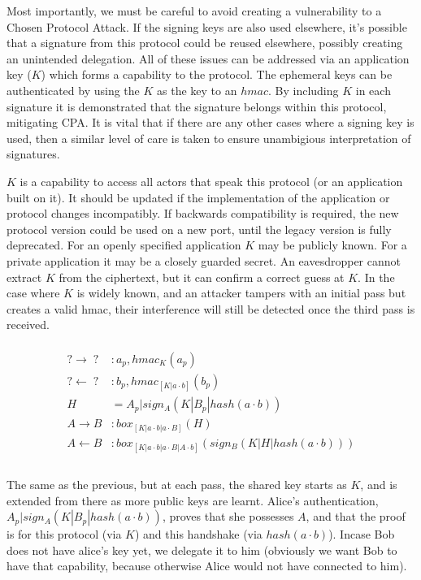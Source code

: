 \documentclass[12pt]{article}
\begin{document}
Most importantly, we must be careful to avoid creating a vulnerability
to a Chosen Protocol Attack\cite{cpa}. If the signing keys are also used
elsewhere, it's possible that a signature from this protocol could be
reused elsewhere, possibly creating an unintended delegation.
All of these issues can be addressed via an application key ($K$)
which forms a capability to the protocol. The ephemeral keys can be
authenticated by using the $K$ as the key to an $hmac$. By including
$K$ in each signature it is demonstrated that the signature belongs
within this protocol, mitigating CPA. It is vital that if there are any
other cases where a signing key is used, then a similar level of care is
taken to ensure unambigious interpretation of signatures.

$K$ is a capability to access all actors that speak this protocol
(or an application built on it). It should be updated if the
implementation of the application or protocol changes incompatibly.
If backwards compatibility is required, the new protocol version could
be used on a new port, until the legacy version is fully deprecated.
For an openly specified application $K$ may be publicly known.
For a private application it may be a closely guarded secret.
An eavesdropper cannot extract $K$ from the ciphertext, but it can
confirm a correct guess at $K$. In the case where $K$ is widely known,
and an attacker tampers with an initial pass but creates a valid hmac,
their interference will still be detected once the third pass is received.

$$
\begin{align*}
\\
    ? \to \;?\;   &: a_p, hmac_{K}(a_p)   \\
    ? \gets \;?\; &: b_p, hmac_{[K|a\cdot b]}(b_p) \\
    H&=A_{p}|sign_A(K|B_p|hash(a\cdot b)) \\
    A \to B       &: box_{[K|a \cdot b | a \cdot B]}(H)\\
    A \gets B     &:
      box_{[K|a \cdot b | a \cdot B | A \cdot b]}(sign_B(K|H|hash(a\cdot b)) )\\
\\
\end{align*}
$$

The same as the previous, but at each pass, the shared key starts
as $K$, and is extended from there as more public keys are learnt.
Alice's authentication, $A_{p}|sign_A(K|B_p|hash(a\cdot b))$,
proves that she possesses $A$, and that the proof is for this protocol
(via $K$) and this handshake (via $hash(a\cdot b)$).
Incase Bob does not have alice's key yet, we delegate it to him
(obviously we want Bob to have that capability, because otherwise
Alice would not have connected to him).
\end{document}

